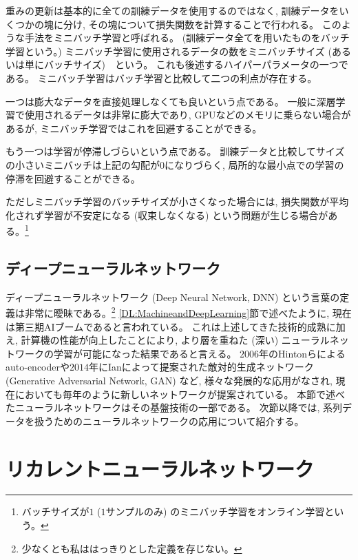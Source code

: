 重みの更新は基本的に全ての訓練データを使用するのではなく, 訓練データをいくつかの塊に分け, その塊について損失関数を計算することで行われる。
このような手法をミニバッチ学習と呼ばれる。
(訓練データ全てを用いたものをバッチ学習という。)
ミニバッチ学習に使用されるデータの数をミニバッチサイズ (あるいは単にバッチサイズ)　という。
これも後述するハイパーパラメータの一つである。
ミニバッチ学習はバッチ学習と比較して二つの利点が存在する。

一つは膨大なデータを直接処理しなくても良いという点である。
一般に深層学習で使用されるデータは非常に膨大であり, GPUなどのメモリに乗らない場合があるが, ミニバッチ学習ではこれを回避することができる。

もう一つは学習が停滞しづらいという点である。
訓練データと比較してサイズの小さいミニバッチは上記の勾配が0になりづらく, 局所的な最小点での学習の停滞を回避することができる。

ただしミニバッチ学習のバッチサイズが小さくなった場合には, 損失関数が平均化されず学習が不安定になる (収束しなくなる) という問題が生じる場合がある。\footnote{バッチサイズが$1$ ($1$サンプルのみ) のミニバッチ学習をオンライン学習という。}


\subsection{ディープニューラルネットワーク} \label{DL:NN:DeepNeuralNetwork}

ディープニューラルネットワーク (Deep Neural Network, DNN) という言葉の定義は非常に曖昧である。\footnote{少なくとも私ははっきりとした定義を存じない。}
\ref{DL:MachineandDeepLearning}節で述べたように, 現在は第三期AIブームであると言われている。
これは上述してきた技術的成熟に加え, 計算機の性能が向上したことにより, より層を重ねた (深い) ニューラルネットワークの学習が可能になった結果であると言える。
$2006$年のHintonらによるauto-encoder\cite{Autoencoder}や$2014$年にIanによって提案された敵対的生成ネットワーク (Generative Adversarial Network, GAN\cite{GenerativeAdversarialNetworks}) など, 様々な発展的な応用がなされ, 現在においても毎年のように新しいネットワークが提案されている。
本節で述べたニューラルネットワークはその基盤技術の一部である。
次節以降では, 系列データを扱うためのニューラルネットワークの応用について紹介する。


\section{リカレントニューラルネットワーク} \label{DL:RecurrentNeuralNetwork}

